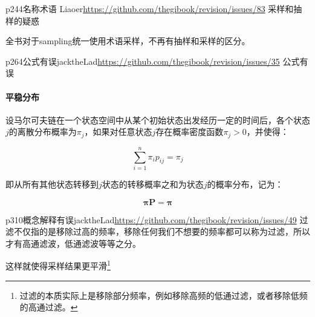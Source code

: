 \begin{revision}{p244}{名称术语}{	Liaoer}{\url{https://github.com/thegibook/revision/issues/83}}
	采样和抽样的疑惑
\end{revision}

全书对于sampling统一使用术语采样，不再有抽样和采样的区分。




\begin{revision}{p264}{公式有误}{jacktheLad}{\url{https://github.com/thegibook/revision/issues/35}}
	公式有误
\end{revision}
\paragraph{平稳分布}
设马尔可夫链在一个状态空间中从某个初始状态出发经历一定的时间后，各个状态$j$的离散分布概率为$\pi_{j}$，如果对任意状态$j$存在概率密度函数$\pi_j>0$，并使得：

\begin{equation}\renewcommand\thefigure{5.36}
	\sum^{n}_{i=1}\pi_i p_{ij}=\pi_j
\end{equation}

\noindent 即从所有其他状态转移到$j$状态的转移概率之和为状态$j$的概率分布，记为：

\begin{equation}\renewcommand\thefigure{5.37}
	\mathbf{\pi} \mathbf{P}=\mathbf{\pi}
\end{equation}



\begin{revision}{p310}{概念解释有误}{jacktheLad}{\url{https://github.com/thegibook/revision/issues/49}}
	过滤不仅指的是移除过高的频率，移除任何我们不想要的频率都可以称为过滤，所以才有高通滤波，低通滤波等等之分。
\end{revision}
\setcounter{footnote}{6}
这样就使得采样结果更平滑\footnote{过滤的本质实际上是移除部分频率，例如移除高频的低通过滤，或者移除低频的高通过滤。}



